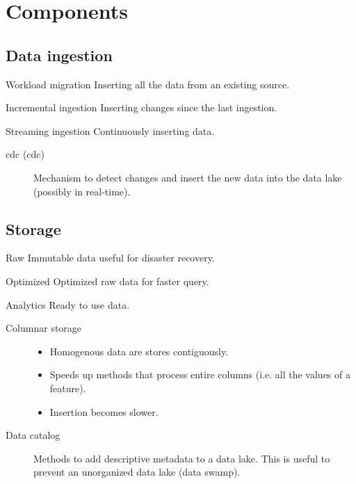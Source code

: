 \section{Components}

\subsection{Data ingestion} 
    \begin{descriptionlist}
        \item[Workload migration]
            Inserting all the data from an existing source.
        \item[Incremental ingestion]
            Inserting changes since the last ingestion.
        \item[Streaming ingestion]   
            Continuously inserting data.
    \end{descriptionlist}

    \begin{description}
        \item[\Acl{cdc} (\Acs{cdc})] 
            Mechanism to detect changes and insert the new data into the data lake (possibly in real-time).
    \end{description}

\subsection{Storage}
\begin{descriptionlist}
    \item[Raw] 
        Immutable data useful for disaster recovery.
    \item[Optimized] 
        Optimized raw data for faster query.
    \item[Analytics] 
        Ready to use data.
\end{descriptionlist}

\begin{description}
    \item[Columnar storage] \phantom{}
        \begin{itemize}
            \item Homogenous data are stores contiguously.
            \item Speeds up methods that process entire columns (i.e. all the values of a feature).
            \item Insertion becomes slower.
        \end{itemize}

    \item[Data catalog]
        Methods to add descriptive metadata to a data lake.
        This is useful to prevent an unorganized data lake (data swamp).
\end{description}
        
